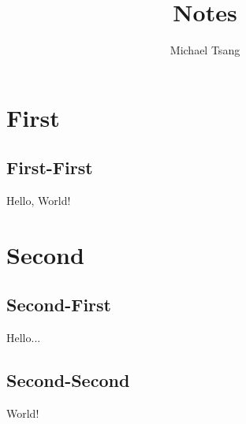 \documentclass[11pt]{article}
\title{Notes}
\author{Michael Tsang}
\begin{document}
\maketitle

\section{First}
\subsection{First-First}
Hello, World!

\section{Second}
\subsection{Second-First}
Hello...
\subsection{Second-Second}
World!
\end{document}

